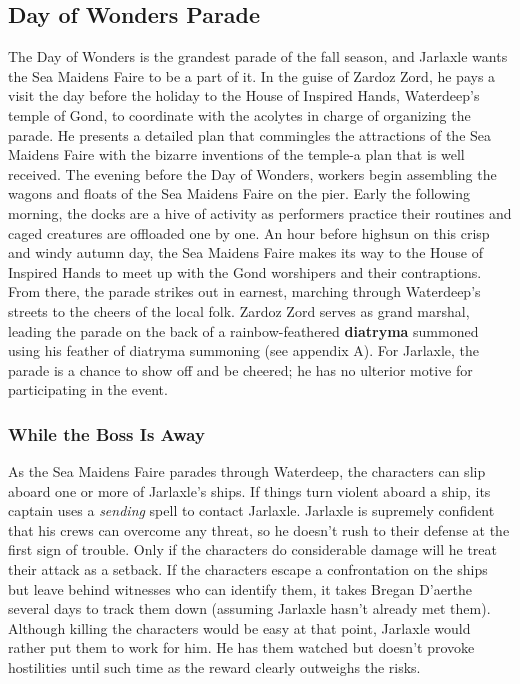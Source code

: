 \documentclass[10pt,a4paper,twoside,twocolumn,openany,nodeprecatedcode]{dndbook}
\begin{document}
\subsection{Day of Wonders Parade}
The Day of Wonders is the grandest parade of the fall season, and Jarlaxle wants the Sea Maidens Faire to be a part of it. In the guise of Zardoz Zord, he pays a visit the day before the holiday to the House of Inspired Hands, Waterdeep's temple of Gond, to coordinate with the acolytes in charge of organizing the parade. He presents a detailed plan that commingles the attractions of the Sea Maidens Faire with the bizarre inventions of the temple-a plan that is well received.
The evening before the Day of Wonders, workers begin assembling the wagons and floats of the Sea Maidens Faire on the pier. Early the following morning, the docks are a hive of activity as performers practice their routines and caged creatures are offloaded one by one. An hour before highsun on this crisp and windy autumn day, the Sea Maidens Faire makes its way to the House of Inspired Hands to meet up with the Gond worshipers and their contraptions. From there, the parade strikes out in earnest, marching through Waterdeep's streets to the cheers of the local folk. Zardoz Zord serves as grand marshal, leading the parade on the back of a rainbow-feathered \textbf{diatryma} summoned using his feather of diatryma summoning (see appendix A). For Jarlaxle, the parade is a chance to show off and be cheered; he has no ulterior motive for participating in the event.
\subsubsection{While the Boss Is Away}
As the Sea Maidens Faire parades through Waterdeep, the characters can slip aboard one or more of Jarlaxle's ships. If things turn violent aboard a ship, its captain uses a \textit{sending} spell to contact Jarlaxle. Jarlaxle is supremely confident that his crews can overcome any threat, so he doesn't rush to their defense at the first sign of trouble. Only if the characters do considerable damage will he treat their attack as a setback.
If the characters escape a confrontation on the ships but leave behind witnesses who can identify them, it takes Bregan D'aerthe several days to track them down (assuming Jarlaxle hasn't already met them). Although killing the characters would be easy at that point, Jarlaxle would rather put them to work for him. He has them watched but doesn't provoke hostilities until such time as the reward clearly outweighs the risks.
\end{document}
